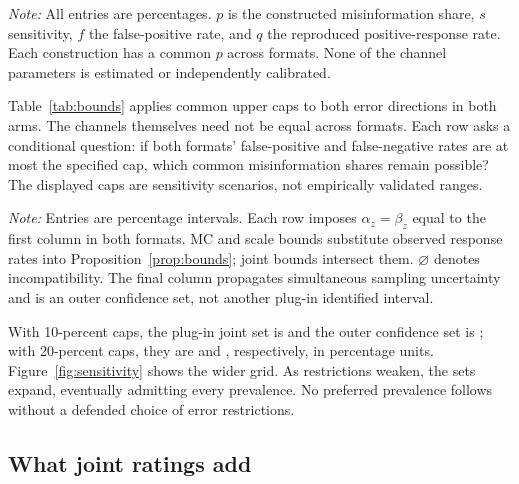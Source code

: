 \documentclass[11pt]{article}
\begin{document}
\begin{table}[htbp]
\centering
\caption{Constructed observationally equivalent response models}
\label{tab:equivalence}
\TableStyle

\begin{minipage}{\linewidth}
\footnotesize\emph{Note:} All entries are percentages. $p$ is the constructed misinformation share, $s$ sensitivity, $f$ the false-positive rate, and $q$ the reproduced positive-response rate. Each construction has a common $p$ across formats. None of the channel parameters is estimated or independently calibrated.
\end{minipage}
\end{table}

Table~\ref{tab:bounds} applies common upper caps to both error directions in both arms. The channels themselves need not be equal across formats. Each row asks a conditional question: if both formats' false-positive and false-negative rates are at most the specified cap, which common misinformation shares remain possible? The displayed caps are sensitivity scenarios, not empirically validated ranges.

\begin{table}[htbp]
\centering
\caption{Misinformation bounds under alternative error caps}
\label{tab:bounds}
\TableStyle

\begin{minipage}{\linewidth}
\footnotesize\emph{Note:} Entries are percentage intervals. Each row imposes $\alpha_z=\beta_z$ equal to the first column in both formats. MC and scale bounds substitute observed response rates into Proposition~\ref{prop:bounds}; joint bounds intersect them. $\varnothing$ denotes incompatibility. The final column propagates simultaneous sampling uncertainty and is an outer confidence set, not another plug-in identified interval.
\end{minipage}
\end{table}

With 10-percent caps, the plug-in joint set is \idTenBounds{} and the outer confidence set is \idTenOuter{}; with 20-percent caps, they are \idTwentyBounds{} and \idTwentyOuter{}, respectively, in percentage units. Figure~\ref{fig:sensitivity} shows the wider grid. As restrictions weaken, the sets expand, eventually admitting every prevalence. No preferred prevalence follows without a defended choice of error restrictions.



\subsection{What joint ratings add}
\end{document}
